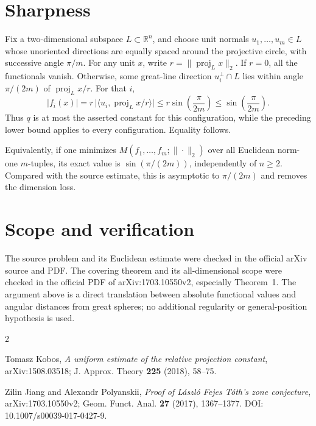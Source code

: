 \documentclass[11pt]{article}
\begin{document}
\section*{Sharpness}

Fix a two-dimensional subspace $L\subset\mathbb R^n$, and choose unit
normals $u_1,\ldots,u_m\in L$ whose unoriented directions are equally spaced
around the projective circle, with successive angle $\pi/m$.  For any unit
$x$, write $r=\|\operatorname{proj}_Lx\|_2$.  If $r=0$, all the functionals
vanish.  Otherwise, some great-line direction $u_i^\perp\cap L$ lies within
angle $\pi/(2m)$ of $\operatorname{proj}_Lx/r$.  For that $i$,
\[
 |f_i(x)|
 =r\,\bigl|\langle u_i,\operatorname{proj}_Lx/r\rangle\bigr|
 \leq r\sin\!\left(\frac{\pi}{2m}\right)
 \leq\sin\!\left(\frac{\pi}{2m}\right).
\]
Thus $q$ is at most the asserted constant for this configuration, while the
preceding lower bound applies to every configuration.  Equality follows.

Equivalently, if one minimizes $M(f_1,\ldots,f_m;\|\cdot\|_2)$ over all
Euclidean norm-one $m$-tuples, its exact value is
$\sin(\pi/(2m))$, independently of $n\geq2$.  Compared with the source
estimate, this is asymptotic to $\pi/(2m)$ and removes the dimension loss.

\section*{Scope and verification}

The source problem and its Euclidean estimate were checked in the official
arXiv source and PDF.  The covering theorem and its all-dimensional scope
were checked in the official PDF of arXiv:1703.10550v2, especially
Theorem~1.  The argument above is a direct translation between absolute
functional values and angular distances from great spheres; no additional
regularity or general-position hypothesis is used.

\sloppy
\begin{thebibliography}{2}
\raggedright
{}
Tomasz Kobos,
\emph{A uniform estimate of the relative projection constant},
arXiv:1508.03518; J. Approx. Theory \textbf{225} (2018), 58--75.

Zilin Jiang and Alexandr Polyanskii,
\emph{Proof of L\'aszl\'o Fejes T\'oth's zone conjecture},
arXiv:1703.10550v2; Geom. Funct. Anal. \textbf{27} (2017), 1367--1377.
DOI: 10.1007/s00039-017-0427-9.
\end{thebibliography}
\end{document}
